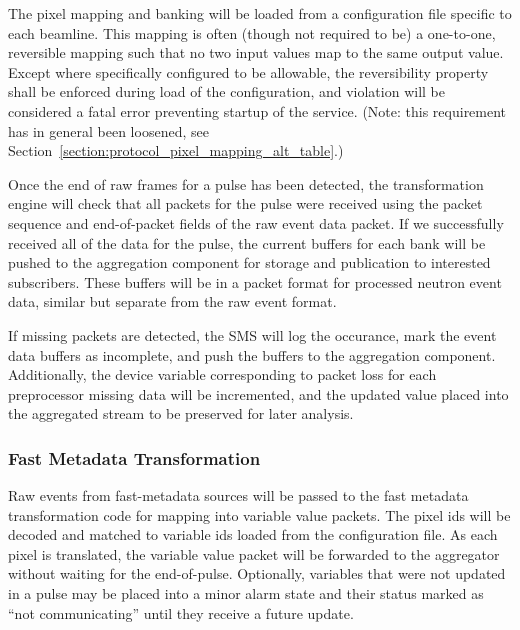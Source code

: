 The pixel mapping and banking will be loaded from a configuration file specific
to each beamline. This mapping is often (though not required to be)
a one-to-one, reversible mapping such
that no two input values map to the same output value.
Except where specifically configured to be allowable,
the reversibility property
shall be enforced during load of the configuration, and violation will be
considered a fatal error preventing startup of the service.
(Note: this requirement has in general been loosened,
see Section~\ref{section:protocol_pixel_mapping_alt_table}.)

Once the end of raw frames for a pulse has been detected, the transformation
engine will check that all packets for the pulse were received using the
packet sequence and end-of-packet fields of the raw event data packet. If
we successfully received all of the data for the pulse, the current buffers
for each bank will be pushed to the aggregation component for storage and
publication to interested subscribers. These buffers will be in a packet format
for processed neutron event data, similar but separate from the raw event
format.

If missing packets are detected, the SMS will log the occurance, mark the
event data buffers as incomplete, and push the buffers to the aggregation
component. Additionally, the device variable corresponding to packet loss
for each preprocessor missing data will be incremented, and the updated
value placed into the aggregated stream to be preserved for later analysis.



\subsubsection{Fast Metadata Transformation}

Raw events from fast-metadata sources will be passed to the fast metadata
transformation code for mapping into variable value packets. The pixel ids will
be decoded and matched to variable ids loaded from the configuration file. As
each pixel is translated, the variable value packet will be forwarded to the
aggregator without waiting for the end-of-pulse. Optionally, variables that
were not updated in a pulse may be placed into a minor alarm state and their
status marked as ``not communicating'' until they receive a future update.

